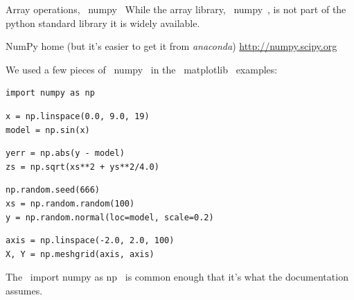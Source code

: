 \documentclass[10pt, t]{beamer}
\let\texttt=\graytt
\let\verb=\codeDelimTwiddles
\begin{document}
\begin{frame}[fragile,label=sec-3-26]{Array operations, \verb~numpy~}
 While the array library, \verb~numpy~, is not part of the python standard library it is widely available.
\begin{block}{NumPy home (but it's easier to get it from \emph{anaconda})}
\url{http://numpy.scipy.org}

\pause
\end{block}
\begin{block}{We used a few pieces of \verb~numpy~ in the \verb~matplotlib~ examples:}
\lstset{language=Python,label= ,caption= ,numbers=none}
\begin{lstlisting}
import numpy as np
\end{lstlisting}
\pause
\lstset{language=Python,label= ,caption= ,numbers=none}
\begin{lstlisting}
x = np.linspace(0.0, 9.0, 19)
model = np.sin(x)
\end{lstlisting}
\pause
\lstset{language=Python,label= ,caption= ,numbers=none}
\begin{lstlisting}
yerr = np.abs(y - model)
zs = np.sqrt(xs**2 + ys**2/4.0)
\end{lstlisting}
\pause
\lstset{language=Python,label= ,caption= ,numbers=none}
\begin{lstlisting}
np.random.seed(666)
xs = np.random.random(100)
y = np.random.normal(loc=model, scale=0.2)
\end{lstlisting}
\pause
\lstset{language=Python,label= ,caption= ,numbers=none}
\begin{lstlisting}
axis = np.linspace(-2.0, 2.0, 100)
X, Y = np.meshgrid(axis, axis)
\end{lstlisting}

\pause
The \verb~import numpy as np~ is common enough that it's what the \texttt{numpy} documentation assumes.
\end{block}
\end{frame}
\end{document}
